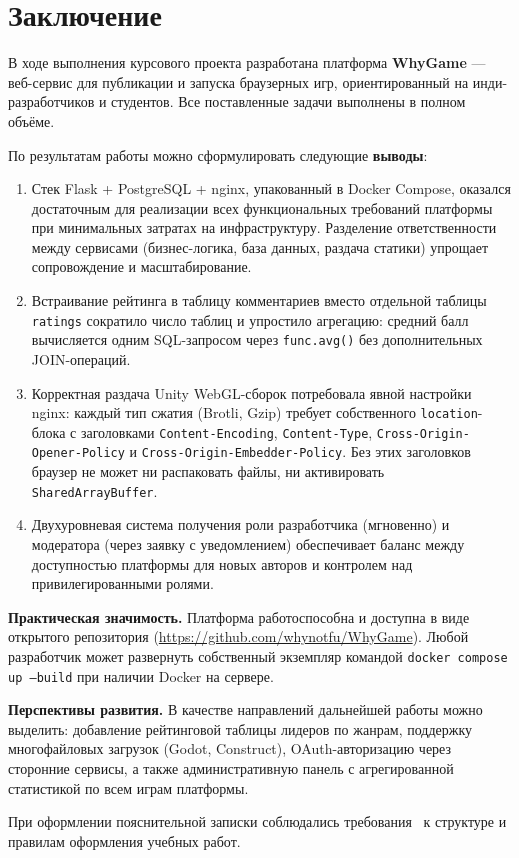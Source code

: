 \section*{Заключение}

В ходе выполнения курсового проекта разработана платформа \textbf{WhyGame} ---
веб-сервис для публикации и запуска браузерных игр, ориентированный на
инди-разработчиков и студентов. Все поставленные задачи выполнены в полном объёме.

По результатам работы можно сформулировать следующие \textbf{выводы}:

\begin{enumerate}
    \item Стек Flask + PostgreSQL + nginx, упакованный в Docker Compose, оказался
    достаточным для реализации всех функциональных требований платформы при
    минимальных затратах на инфраструктуру. Разделение ответственности между
    сервисами (бизнес-логика, база данных, раздача статики) упрощает
    сопровождение и масштабирование.

    \item Встраивание рейтинга в таблицу комментариев вместо отдельной таблицы
    \texttt{ratings} сократило число таблиц и упростило агрегацию: средний балл
    вычисляется одним SQL-запросом через \texttt{func.avg()} без дополнительных
    JOIN-операций.

    \item Корректная раздача Unity WebGL-сборок потребовала явной настройки nginx:
    каждый тип сжатия (Brotli, Gzip) требует собственного \texttt{location}-блока
    с заголовками \texttt{Content-Encoding}, \texttt{Content-Type},
    \texttt{Cross-Origin-Opener-Policy} и \texttt{Cross-Origin-Embedder-Policy}.
    Без этих заголовков браузер не может ни распаковать файлы, ни активировать
    \texttt{SharedArrayBuffer}.

    \item Двухуровневая система получения роли разработчика (мгновенно) и
    модератора (через заявку с уведомлением) обеспечивает баланс между
    доступностью платформы для новых авторов и контролем над привилегированными
    ролями.
\end{enumerate}

\textbf{Практическая значимость.} Платформа работоспособна и доступна в виде
открытого репозитория (\url{https://github.com/whynotfu/WhyGame}). Любой
разработчик может развернуть собственный экземпляр командой
\texttt{docker compose up --build} при наличии Docker на сервере.

\textbf{Перспективы развития.} В качестве направлений дальнейшей работы можно
выделить: добавление рейтинговой таблицы лидеров по жанрам, поддержку
многофайловых загрузок (Godot, Construct), OAuth-авторизацию через сторонние
сервисы, а также административную панель с агрегированной статистикой по всем
играм платформы.

При оформлении пояснительной записки соблюдались требования~\cite{gost_report}
к структуре и правилам оформления учебных работ.

